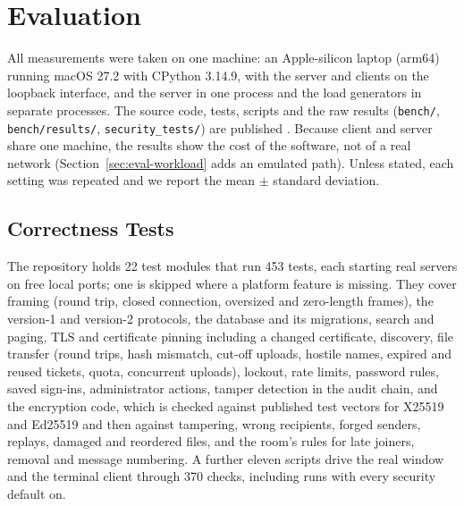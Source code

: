 \documentclass[conference]{IEEEtran}
\newcommand{\code}[1]{\texttt{#1}}
\begin{document}
\section{Evaluation}\label{sec:eval}
All measurements were taken on one machine: an Apple-silicon laptop (arm64) running macOS 27.2 with CPython 3.14.9, with the server and clients on the loopback interface, and the server in one process and the load generators in separate processes. The source code, tests, scripts and the raw results (\code{bench/}, \code{bench/results/}, \code{security\_tests/}) are published \cite{lanchatrepo}. Because client and server share one machine, the results show the cost of the software, not of a real network (Section~\ref{sec:eval-workload} adds an emulated path). Unless stated, each setting was repeated and we report the mean $\pm$ standard deviation.

\subsection{Correctness Tests}
The repository holds 22 test modules that run 453 tests, each starting real servers on free local ports; one is skipped where a platform feature is missing. They cover framing (round trip, closed connection, oversized and zero-length frames), the version-1 and version-2 protocols, the database and its migrations, search and paging, TLS and certificate pinning including a changed certificate, discovery, file transfer (round trips, hash mismatch, cut-off uploads, hostile names, expired and reused tickets, quota, concurrent uploads), lockout, rate limits, password rules, saved sign-ins, administrator actions, tamper detection in the audit chain, and the encryption code, which is checked against published test vectors for X25519 and Ed25519 \cite{rfc7748,rfc8032} and then against tampering, wrong recipients, forged senders, replays, damaged and reordered files, and the room's rules for late joiners, removal and message numbering. A further eleven scripts drive the real window and the terminal client through 370 checks, including runs with every security default on.
\end{document}
